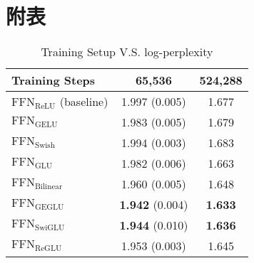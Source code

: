\appendix
\section{附表}\label{sec-9}
\begin{table}[h]
    \centering
    \begin{tabular}{l|cc}
    \toprule
    \textbf{Training Steps} & \textbf{65,536} & \textbf{524,288} \\
    \midrule
    $\text{FFN}_{\text{ReLU}}$ (baseline) & 1.997 (0.005) & 1.677 \\
    $\text{FFN}_{\text{GELU}}$ & 1.983 (0.005) & 1.679 \\
    $\text{FFN}_{\text{Swish}}$ & 1.994 (0.003) & 1.683 \\
    \midrule
    $\text{FFN}_{\text{GLU}}$ & 1.982 (0.006) & 1.663 \\
    $\text{FFN}_{\text{Bilinear}}$ & 1.960 (0.005) & 1.648 \\
    $\text{FFN}_{\text{GEGLU}}$ & \textbf{1.942} (0.004) & \textbf{1.633} \\
    $\text{FFN}_{\text{SwiGLU}}$ & \textbf{1.944} (0.010) & \textbf{1.636} \\
    $\text{FFN}_{\text{ReGLU}}$ & 1.953 (0.003) & 1.645 \\
    \bottomrule
\end{tabular}
\caption{Training Setup V.S. log-perplexity}
\label{tab:results}
\end{table}


